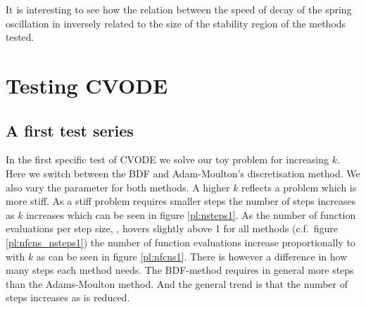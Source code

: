 \documentclass{report}
\begin{document}
It is interesting to see how the relation between the speed of decay of the spring oscillation in inversely related to the size of the stability region of the methods tested.


\newpage
\newpage


\section*{Testing CVODE}
\subsection*{A first test series}

In the first specific test of CVODE we solve our toy problem for increasing $k$. Here we switch between the BDF and Adam-Moulton's discretisation method. We also vary the  parameter for both methods.
A higher $k$ reflects a problem which is more stiff. As a stiff problem requires smaller steps the number of steps  increases as $k$ increases which  can be seen in figure \ref{pl:nsteps1}. As the number of function evaluations per step size, , hovers slightly above 1 for all methods (c.f.\ figure \ref{pl:nfcns_nsteps1}) the number of function evaluations increase proportionally to  with $k$ as can be seen in figure \ref{pl:nfcns1}. There is however a difference in how many steps each method needs. The BDF-method requires in general more steps than the Adams-Moulton method. And the general trend is that the number of steps increases as  is reduced. 
\end{document}
